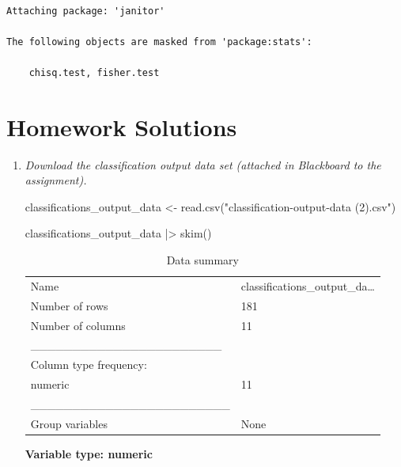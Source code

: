 \documentclass[
  11pt]{article}
\newenvironment{Shaded}{\begin{snugshade}}{\end{snugshade}}
\newcommand{\FunctionTok}[1]{\textcolor[rgb]{0.28,0.35,0.67}{#1}}
\newcommand{\NormalTok}[1]{\textcolor[rgb]{0.00,0.23,0.31}{#1}}
\newcommand{\OtherTok}[1]{\textcolor[rgb]{0.00,0.23,0.31}{#1}}
\newcommand{\SpecialCharTok}[1]{\textcolor[rgb]{0.37,0.37,0.37}{#1}}
\newcommand{\StringTok}[1]{\textcolor[rgb]{0.13,0.47,0.30}{#1}}
\begin{document}
\begin{verbatim}

Attaching package: 'janitor'

The following objects are masked from 'package:stats':

    chisq.test, fisher.test
\end{verbatim}

\section{Homework Solutions}\label{homework-solutions}

\begin{enumerate}
\def\labelenumi{\arabic{enumi}.}
\item
  \emph{Download the classification output data set (attached in
  Blackboard to the assignment).}

\begin{Shaded}
\begin{Highlighting}[]
\NormalTok{classifications\_output\_data }\OtherTok{\textless{}{-}} \FunctionTok{read.csv}\NormalTok{(}\StringTok{"classification{-}output{-}data (2).csv"}\NormalTok{)}

\NormalTok{classifications\_output\_data }\SpecialCharTok{|\textgreater{}} \FunctionTok{skim}\NormalTok{()}
\end{Highlighting}
\end{Shaded}

  \begin{longtable}[]{@{}ll@{}}
  \caption{Data summary}\tabularnewline
  \toprule\noalign{}
  \endfirsthead
  \endhead
  \bottomrule\noalign{}
  \endlastfoot
  Name & classifications\_output\_da\ldots{} \\
  Number of rows & 181 \\
  Number of columns & 11 \\
  \_\_\_\_\_\_\_\_\_\_\_\_\_\_\_\_\_\_\_\_\_\_\_ & \\
  Column type frequency: & \\
  numeric & 11 \\
  \_\_\_\_\_\_\_\_\_\_\_\_\_\_\_\_\_\_\_\_\_\_\_\_ & \\
  Group variables & None \\
  \end{longtable}

  \textbf{Variable type: numeric}


\end{enumerate}
\end{document}

